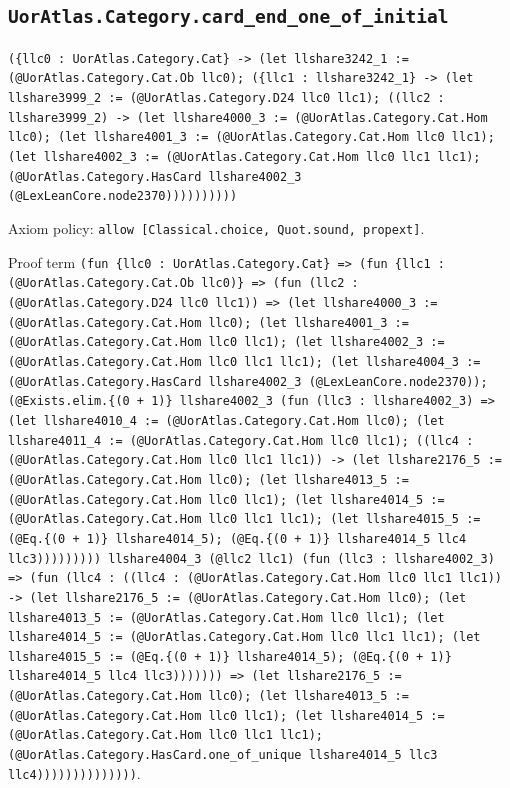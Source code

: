 \documentclass[11pt]{article}
\begin{document}
\subsection*{\texttt{UorAtlas.Category.card\_end\_one\_of\_initial}}
\noindent\texttt{(\{llc0 : UorAtlas.Category.Cat\} -> (let llshare3242\_1 := (@UorAtlas.Category.Cat.Ob llc0); (\{llc1 : llshare3242\_1\} -> (let llshare3999\_2 := (@UorAtlas.Category.D24 llc0 llc1); ((llc2 : llshare3999\_2) -> (let llshare4000\_3 := (@UorAtlas.Category.Cat.Hom llc0); (let llshare4001\_3 := (@UorAtlas.Category.Cat.Hom llc0 llc1); (let llshare4002\_3 := (@UorAtlas.Category.Cat.Hom llc0 llc1 llc1); (@UorAtlas.Category.HasCard llshare4002\_3 (@LexLeanCore.node2370))))))))))}\par
\noindent Axiom policy: \texttt{allow [Classical.choice, Quot.sound, propext]}.\par
\noindent Proof term \texttt{(fun \{llc0 : UorAtlas.Category.Cat\} => (fun \{llc1 : (@UorAtlas.Category.Cat.Ob llc0)\} => (fun (llc2 : (@UorAtlas.Category.D24 llc0 llc1)) => (let llshare4000\_3 := (@UorAtlas.Category.Cat.Hom llc0); (let llshare4001\_3 := (@UorAtlas.Category.Cat.Hom llc0 llc1); (let llshare4002\_3 := (@UorAtlas.Category.Cat.Hom llc0 llc1 llc1); (let llshare4004\_3 := (@UorAtlas.Category.HasCard llshare4002\_3 (@LexLeanCore.node2370)); (@Exists.elim.\{(0 + 1)\} llshare4002\_3 (fun (llc3 : llshare4002\_3) => (let llshare4010\_4 := (@UorAtlas.Category.Cat.Hom llc0); (let llshare4011\_4 := (@UorAtlas.Category.Cat.Hom llc0 llc1); ((llc4 : (@UorAtlas.Category.Cat.Hom llc0 llc1 llc1)) -> (let llshare2176\_5 := (@UorAtlas.Category.Cat.Hom llc0); (let llshare4013\_5 := (@UorAtlas.Category.Cat.Hom llc0 llc1); (let llshare4014\_5 := (@UorAtlas.Category.Cat.Hom llc0 llc1 llc1); (let llshare4015\_5 := (@Eq.\{(0 + 1)\} llshare4014\_5); (@Eq.\{(0 + 1)\} llshare4014\_5 llc4 llc3))))))))) llshare4004\_3 (@llc2 llc1) (fun (llc3 : llshare4002\_3) => (fun (llc4 : ((llc4 : (@UorAtlas.Category.Cat.Hom llc0 llc1 llc1)) -> (let llshare2176\_5 := (@UorAtlas.Category.Cat.Hom llc0); (let llshare4013\_5 := (@UorAtlas.Category.Cat.Hom llc0 llc1); (let llshare4014\_5 := (@UorAtlas.Category.Cat.Hom llc0 llc1 llc1); (let llshare4015\_5 := (@Eq.\{(0 + 1)\} llshare4014\_5); (@Eq.\{(0 + 1)\} llshare4014\_5 llc4 llc3))))))) => (let llshare2176\_5 := (@UorAtlas.Category.Cat.Hom llc0); (let llshare4013\_5 := (@UorAtlas.Category.Cat.Hom llc0 llc1); (let llshare4014\_5 := (@UorAtlas.Category.Cat.Hom llc0 llc1 llc1); (@UorAtlas.Category.HasCard.one\_of\_unique llshare4014\_5 llc3 llc4))))))))))))))}.\par
\end{document}
